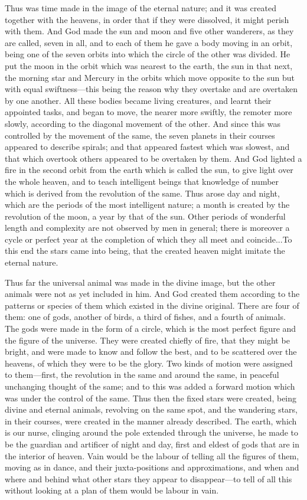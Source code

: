 Thus was time made in the image of the eternal nature; and it was created
together with the heavens, in order that if they were dissolved, it might
perish with them. And God made the sun and moon and five other wanderers,
as they are called, seven in all, and to each of them he gave a body
moving in an orbit, being one of the seven orbits into which the circle of
the other was divided. He put the moon in the orbit which was nearest to
the earth, the sun in that next, the morning star and Mercury in the
orbits which move opposite to the sun but with equal swiftness—this
being the reason why they overtake and are overtaken by one another. All
these bodies became living creatures, and learnt their appointed tasks,
and began to move, the nearer more swiftly, the remoter more slowly,
according to the diagonal movement of the other. And since this was
controlled by the movement of the same, the seven planets in their courses
appeared to describe spirals; and that appeared fastest which was slowest,
and that which overtook others appeared to be overtaken by them. And God
lighted a fire in the second orbit from the earth which is called the sun,
to give light over the whole heaven, and to teach intelligent beings that
knowledge of number which is derived from the revolution of the same. Thus
arose day and night, which are the periods of the most intelligent nature;
a month is created by the revolution of the moon, a year by that of the
sun. Other periods of wonderful length and complexity are not observed by
men in general; there is moreover a cycle or perfect year at the
completion of which they all meet and coincide...To this end the stars
came into being, that the created heaven might imitate the eternal nature.

Thus far the universal animal was made in the divine image, but the other
animals were not as yet included in him. And God created them according to
the patterns or species of them which existed in the divine original.
There are four of them: one of gods, another of birds, a third of fishes,
and a fourth of animals. The gods were made in the form of a circle, which
is the most perfect figure and the figure of the universe. They were
created chiefly of fire, that they might be bright, and were made to know
and follow the best, and to be scattered over the heavens, of which they
were to be the glory. Two kinds of motion were assigned to them—first,
the revolution in the same and around the same, in peaceful unchanging
thought of the same; and to this was added a forward motion which was
under the control of the same. Thus then the fixed stars were created,
being divine and eternal animals, revolving on the same spot, and the
wandering stars, in their courses, were created in the manner already
described. The earth, which is our nurse, clinging around the pole
extended through the universe, he made to be the guardian and artificer of
night and day, first and eldest of gods that are in the interior of
heaven. Vain would be the labour of telling all the figures of them,
moving as in dance, and their juxta-positions and approximations, and when
and where and behind what other stars they appear to disappear—to
tell of all this without looking at a plan of them would be labour in
vain.

